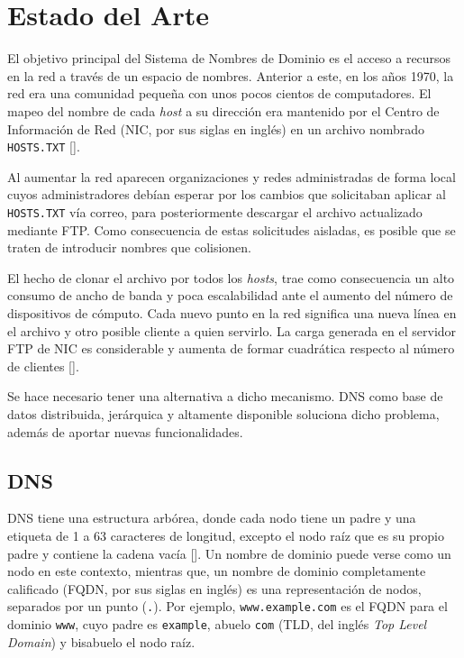 \chapter{Estado del Arte}\label{chapter:state-of-the-art}

El objetivo principal del Sistema de Nombres de Dominio es el acceso a recursos en la red a través de un espacio de nombres. Anterior a este, en los años 1970, la red era una comunidad pequeña con unos pocos cientos de computadores. El mapeo del nombre de cada \textit{host} a su dirección era mantenido por el Centro de Información de Red (NIC, por sus siglas en inglés) en un archivo nombrado \verb+HOSTS.TXT+ [\cite{rfc_1034}].

Al aumentar la red aparecen organizaciones y redes administradas de forma local cuyos administradores debían esperar por los cambios que solicitaban aplicar al \verb|HOSTS.TXT| vía correo, para posteriormente descargar el archivo actualizado mediante FTP. Como consecuencia de estas solicitudes aisladas, es posible que se traten de introducir nombres que colisionen. 


El hecho de clonar el archivo por todos los \textit{hosts}, trae como consecuencia un alto consumo de ancho de banda y poca escalabilidad ante el aumento del número de dispositivos de cómputo. Cada nuevo punto en la red significa una nueva línea en el archivo y otro posible cliente a quien servirlo. La carga generada en el servidor FTP de NIC es considerable y aumenta de formar cuadrática respecto al número de clientes [\cite{rfc_1034}].

Se hace necesario tener una alternativa a dicho mecanismo. DNS como base de datos distribuida, jerárquica y altamente disponible soluciona dicho problema, además de aportar nuevas funcionalidades.

\section{DNS}

DNS tiene una estructura arbórea, donde cada nodo tiene un padre y una etiqueta de 1 a 63 caracteres de longitud, excepto el nodo raíz que es su propio padre y contiene la cadena vacía [\cite{Vixie_2007}]. Un nombre de dominio puede verse como un nodo en este contexto, mientras que, un nombre de dominio completamente calificado (FQDN, por sus siglas en inglés) es una representación de nodos, separados por un punto (\verb+.+). Por ejemplo, \verb+www.example.com+ es el FQDN para el dominio \verb+www+, cuyo padre es \verb+example+, abuelo \verb+com+ (TLD, del inglés \textit{Top Level Domain}) y bisabuelo el nodo raíz.

